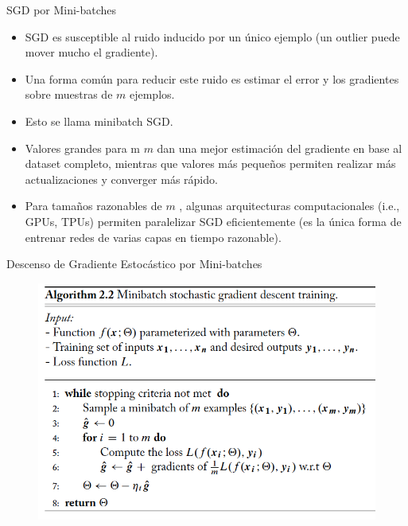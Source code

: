 \documentclass[handout]{beamer}
\begin{document}
\begin{frame}{SGD por Mini-batches}


\begin{scriptsize}
\begin{itemize}
\item SGD es susceptible al ruido inducido por un único ejemplo (un outlier puede mover mucho el gradiente).
\item Una forma común para reducir este ruido es estimar el error y los gradientes sobre muestras de  $m$ ejemplos.
\item Esto se llama minibatch SGD.


\item Valores grandes para m $m$ dan una mejor estimación del gradiente en base al dataset completo, mientras que valores más pequeños permiten realizar más actualizaciones y converger más rápido.

\item Para tamaños razonables de $m$ , algunas arquitecturas computacionales (i.e., GPUs, TPUs) permiten paralelizar SGD eficientemente (es la única forma de entrenar redes de varias capas en tiempo razonable).

\end{itemize}
\end{scriptsize}


\end{frame}


\begin{frame}{Descenso de Gradiente Estocástico por Mini-batches}






\begin{figure}[htb]
	\centering
	 \includegraphics[scale=0.4]{imagenes/minibatch-SGD.png}
\end{figure}


\end{frame}
\end{document}
